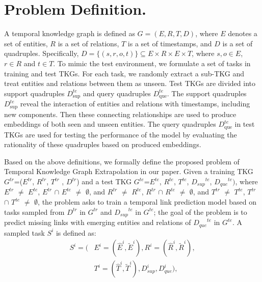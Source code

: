 \documentclass[sigconf]{acmart}
\begin{document}
\section{Problem Definition.} 
A temporal knowledge graph is defined as $ {G}=( {E},  {R},  {T},  {D})$, where $ {E}$ denotes a set of entities, $ {R}$ is a set of relations, $ {T}$ is a set of timestamps, and $ {D}$ is a set of quadruples. Specifically, $ {D}=\{(s, r, o, t)\} \subseteq  {E} \times  {R} \times  {E} \times  {T}$, where $s, o \in  {E}$, $r \in  {R}$ and $ t \in  {T}$.
To mimic the test environment, we formulate a set of tasks in training and test TKGs. For each task, we randomly extract a sub-TKG and treat entities and relations between them as unseen. Test TKGs are divided into support quadruples $ {D}_{\text {sup}}^{t e}$ and query quadruples $ {D}_{\text {que}}^{t e}$. The support quadruples $ {D}_{\text {sup}}^{t e}$  reveal the interaction of entities and relations with timestamps, including new components. Then these connecting relationships are used to produce embeddings of both seen and unseen entities. The query quadruples $ {D}_{\text {que}}^{t e}$ in test TKGs are used for testing the performance of the model by evaluating the rationality of these quadruples based on produced embeddings.
\par
Based on the above definitions, we formally define the proposed problem of Temporal Knowledge Graph Extrapolation in our paper. Given a training TKG $ {G}^{t r}$=($ {E}^{t r}$, $ {R}^{t r}$, $ {T}^{t r}$ , $ {D}^{t r}$) and a test TKG $ {G}^{t e}$=$ {E}^{t e}$, $ {R}^{t e}$, $ {T}^{t e}$,  $ {{D}_{ s u p}}^{t e}$, $ {{D}_{ q u e}}^{t e})$, where $ {E}^{t r}$ $\neq$ $ {E}^{t e}$, $ {E}^{t r}$ $\cap$ $ {E}^{t e}$ $\neq$ $\emptyset$, and $ {R}^{t r}$ $\neq$ $ {R}^{t e}$, $ {R}^{t r}$ $\cap$ $ {R}^{t e}$ $\neq$ $\emptyset$, and $ {T}^{t r}$ $\neq$ $ {T}^{t e}$, $ {T}^{t r}$ $\cap$ $ {T}^{t e}$ $\neq$ $\emptyset$, the problem asks to train a temporal link prediction model based on tasks sampled from  $ {D}^{t r}$ in $ {G}^{t r}$ and $ {{D}_{ s u p}}^{t e}$ in $ {G}^{t e}$; the goal of the problem is to predict missing links with 
emerging entities and relations of $ {{D}_{ q u e}}^{t e}$ in $ {G}^{t e}$. A sampled task $ {S}^{i}$ is defined as:
\begin{equation}
\begin{split}
 {S}^{i} = \Big(  & {E}^{i} = \left( \widehat{ {E}}^{i} ,  \widetilde{ {E}}^{i} \right) ,   {R}^{i} = \left( \widehat{ {R}}^{i} , \widetilde{ {R}}^{i}  \right),
\\
&  {T}^{i} = \left( \widehat{ {T}}^{i} ,  \widetilde{ {T}}^{i} \right) ,   {D}_{s u p}^{i} ,   {D}_{q u e}^{i} \Big),
\end{split}
\label{equ1}
\end{equation}
\end{document}
